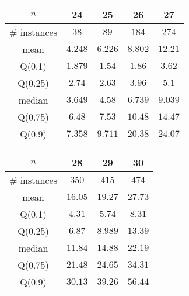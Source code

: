 \begin{tabular}{c|cccc} 
\hline 
$n$ & 24 & 25 & 26 & 27 \tabularnewline 
\hline 
\hline 
\# instances & $38$ & $89$ & $184$ & $274$ \tabularnewline 
mean & $4.248$ & $6.226$ & $8.802$ & $12.21$ \tabularnewline 
Q(0.1) & $1.879$ & $1.54$ & $1.86$ & $3.62$ \tabularnewline 
Q(0.25) & $2.74$ & $2.63$ & $3.96$ & $5.1$ \tabularnewline 
median & $3.649$ & $4.58$ & $6.739$ & $9.039$ \tabularnewline 
Q(0.75) & $6.48$ & $7.53$ & $10.48$ & $14.47$ \tabularnewline 
Q(0.9) & $7.358$ & $9.711$ & $20.38$ & $24.07$ \tabularnewline 
\hline 
\end{tabular} 
\medskip{} 

\begin{tabular}{c|ccc} 
\hline 
$n$ & 28 & 29 & 30 \tabularnewline 
\hline 
\hline 
\# instances & $350$ & $415$ & $474$ \tabularnewline 
mean & $16.05$ & $19.27$ & $27.73$ \tabularnewline 
Q(0.1) & $4.31$ & $5.74$ & $8.31$ \tabularnewline 
Q(0.25) & $6.87$ & $8.989$ & $13.39$ \tabularnewline 
median & $11.84$ & $14.88$ & $22.19$ \tabularnewline 
Q(0.75) & $21.48$ & $24.65$ & $34.31$ \tabularnewline 
Q(0.9) & $30.13$ & $39.26$ & $56.44$ \tabularnewline 
\hline 
\end{tabular} 
\medskip{} 

